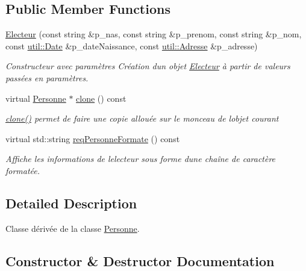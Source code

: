 \subsection*{Public Member Functions}
\begin{DoxyCompactItemize}
\item 
\hyperlink{classelections_1_1Electeur_acaa3408d3c2556b55d3f1bb880edfd19}{Electeur} (const string \&p\+\_\+nas, const string \&p\+\_\+prenom, const string \&p\+\_\+nom, const \hyperlink{classutil_1_1Date}{util\+::\+Date} \&p\+\_\+date\+Naissance, const \hyperlink{classutil_1_1Adresse}{util\+::\+Adresse} \&p\+\_\+adresse)
\begin{DoxyCompactList}\small\item\em Constructeur avec paramètres Création d\textquotesingle{}un objet \hyperlink{classelections_1_1Electeur}{Electeur} à partir de valeurs passées en paramètres. \end{DoxyCompactList}\item 
virtual \hyperlink{classelections_1_1Personne}{Personne} $\ast$ \hyperlink{classelections_1_1Electeur_a948f48b32633f91670b3b0fde9dff3a4}{clone} () const
\begin{DoxyCompactList}\small\item\em \hyperlink{classelections_1_1Electeur_a948f48b32633f91670b3b0fde9dff3a4}{clone()} permet de faire une copie allouée sur le monceau de l\textquotesingle{}objet courant \end{DoxyCompactList}\item 
virtual std\+::string \hyperlink{classelections_1_1Electeur_ac233f4fb12d9267374c8e66864d89689}{req\+Personne\+Formate} () const
\begin{DoxyCompactList}\small\item\em Affiche les informations de l\textquotesingle{}electeur sous forme d\textquotesingle{}une chaîne de caractère formatée. \end{DoxyCompactList}\end{DoxyCompactItemize}


\subsection{Detailed Description}
Classe dérivée de la classe \hyperlink{classelections_1_1Personne}{Personne}. 

\subsection{Constructor \& Destructor Documentation}
\mbox{\label{classelections_1_1Electeur_acaa3408d3c2556b55d3f1bb880edfd19}} 
